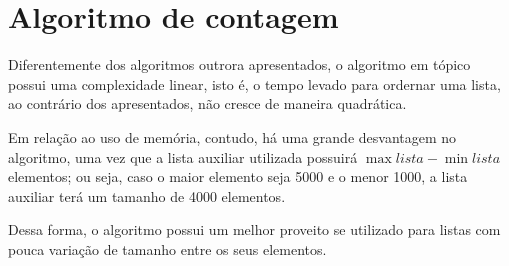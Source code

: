 \section{Algoritmo de contagem}
Diferentemente dos algoritmos outrora apresentados, o algoritmo em tópico possui uma complexidade linear, isto é, o tempo levado para ordernar uma lista, ao contrário dos apresentados, não cresce de maneira quadrática. 

Em relação ao uso de memória, contudo, há uma grande desvantagem no algoritmo, uma vez que a lista auxiliar utilizada possuirá $\max{lista}-\min{lista} $ elementos; ou seja, caso o maior elemento seja 5000 e o menor 1000, a lista auxiliar terá um tamanho de 4000 elementos.

Dessa forma, o algoritmo possui um melhor proveito se utilizado para listas com pouca variação de tamanho entre os seus elementos.
